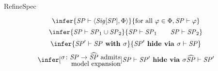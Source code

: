 \begin{entry}{RefineSpec}  


\newcommand{\ang}[1]{\langle{#1}\rangle}
\newcommand{\Family}[2]{\ang{#1}_{#2}}
\newcommand{\SP}{\mathit{SP}}
\newcommand{\SPSig}[1]{{\mathit{Sig}}[#1]}
\newcommand{\SPMod}[1]{{\mathit{Mod}}[#1]}
\newcommand{\INS}{{\bf INS}}
\newcommand{\Sign}{{\bf Sign}}
\newcommand{\Sen}{{\bf Sen}}
\newcommand{\Set}{{\bf Set}}
\newcommand{\Mod}{{\bf Mod}}
\newcommand{\Cat}{{\bf Cat}}
\newcommand{\op}{\mathit{op}}
\newcommand{\pow}{{\mathit{Pow}}}
\newcommand{\translate}[2]{#1\textbf{\upshape{} with }#2}
\newcommand{\derive}[2]{#1\textbf{\upshape{} hide via }#2}
\newcommand{\union}[2]{#1 \cup #2}

\begin{calculus}


\[
\infer{\SP \vdash \ang{\SPSig{\SP},\Phi}}
      { \textrm{for all } \varphi \in \Phi, \SP \vdash \varphi}
\]
\[
\infer{\SP \vdash \union{\SP_1}{\SP_2}}
      {\SP \vdash \SP_1 \qquad \SP \vdash \SP_2}
\]
\[
\infer{\SP' \vdash \translate{\SP}{\sigma}}
      {\derive{\SP'}{\sigma} \vdash \SP}
\]
\[
\infer[\renewcommand{\arraystretch}{0.8}%
        \begin{array}{@{}l@{}}
           \sigma\colon\SP\rightarrow\widehat{\SP}
           \textrm{ admits} \\
           \hfill \textrm{model expansion}
        \end{array}]{\SP \vdash \derive{\SP'}{\sigma}}
                    {\widehat{\SP} \vdash \SP'}
\]

\end{calculus}


\end{entry}

